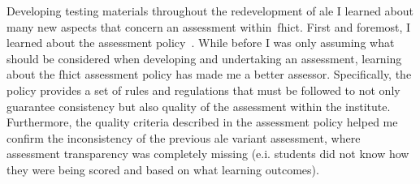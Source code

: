 Developing testing materials throughout the redevelopment of \acrshort{ale} I learned about many new aspects that concern an assessment within~\acrshort{fhict}. First and foremost, I learned about the assessment policy~\cite{FHICTAssesmentPolicy}. While before I was only assuming what should be considered when developing and undertaking an assessment, learning about the \acrshort{fhict} assessment policy has made me a better assessor. Specifically, the policy provides a set of rules and regulations that must be followed to not only guarantee consistency but also quality of the assessment within the institute. Furthermore, the quality criteria described in the assessment policy helped me confirm the inconsistency of the previous \acrshort{ale} variant assessment, where assessment transparency was completely missing (e.i. students did not know how they were being scored and based on what learning outcomes).\\\\

